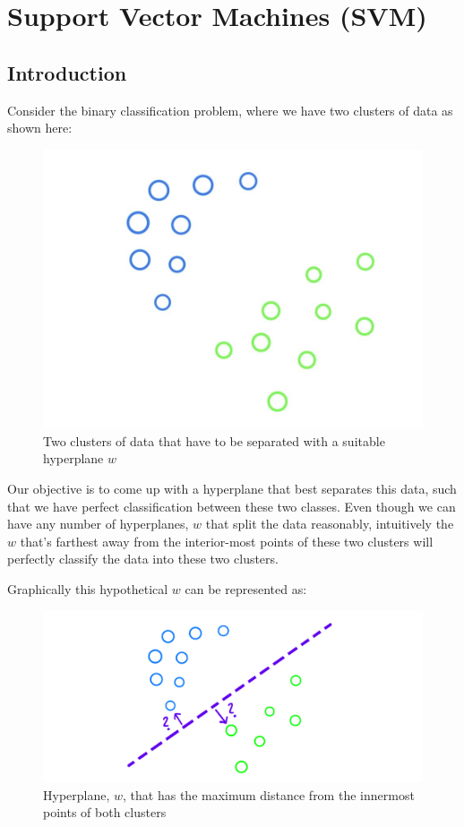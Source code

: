 \documentclass[11pt]{article}
\begin{document}
\section{Support Vector Machines (SVM)}
\normalfont

\subsection{Introduction}
Consider the binary classification problem, where we have two clusters of data as shown here:

\begin{figure}[h]
    \centering
    \includegraphics[scale = 0.25]{figures/OGData.jpg}
    \caption{Two clusters of data that have to be separated with a suitable hyperplane $w$}
    \label{fig:DataClusters}
\end{figure}

Our objective is to come up with a hyperplane that best separates this data, such that we have perfect classification between these two classes. Even though we can have any  number of hyperplanes, $w$ that split the data reasonably, intuitively the $w$ that's farthest away from the interior-most points of these two clusters will perfectly classify the data into these two clusters.

Graphically this hypothetical $w$ can be represented as:

\begin{figure}[h]
    \centering
    \includegraphics[scale = 0.25]{figures/HowToData.PNG}
    \caption{Hyperplane, $w$, that has the maximum distance from the innermost points of both clusters}
    \label{fig:maxMargin}
\end{figure}
\end{document}
